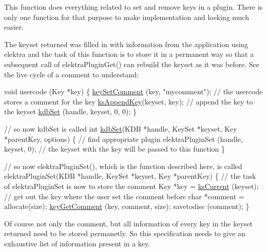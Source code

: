 This function does everything related to set and remove keys in a plugin. There is only one function for that purpose to make implementation and locking much easier.

The keyset {\ttfamily returned} was filled in with information from the application using elektra and the task of this function is to store it in a permanent way so that a subsequent call of elektra\-Plugin\-Get() can rebuild the keyset as it was before. See the live cycle of a comment to understand\-: 
\begin{DoxyCode}
\textcolor{keywordtype}{void} usercode (Key *key)
\{
        \hyperlink{group__keyvalue_ga8863a877a84fa46e6017fe72e49b89c1}{keySetComment} (key, \textcolor{stringliteral}{"mycomment"}); \textcolor{comment}{// the usercode stores a
       comment for the key}
        \hyperlink{group__keyset_gaa5a1d467a4d71041edce68ea7748ce45}{ksAppendKey}(keyset, key); \textcolor{comment}{// append the key to the keyset}
        \hyperlink{group__kdb_ga11436b058408f83d303ca5e996832bcf}{kdbSet} (handle, keyset, 0, 0);
\}

\textcolor{comment}{// so now kdbSet is called}
\textcolor{keywordtype}{int} \hyperlink{group__kdb_ga11436b058408f83d303ca5e996832bcf}{kdbSet}(KDB *handle, KeySet *keyset, Key *parentKey, options)
\{
        \textcolor{comment}{// find appropriate plugin}
        elektraPluginSet (handle, keyset, 0); \textcolor{comment}{// the keyset with the key will
       be passed to this function}
\}

\textcolor{comment}{// so now elektraPluginSet(), which is the function described here, is called}
elektraPluginSet(KDB *handle, KeySet *keyset, Key *parentKey)
\{
        \textcolor{comment}{// the task of elektraPluginSet is now to store the comment}
        Key *key = \hyperlink{group__keyset_ga4287b9416912c5f2ab9c195cb74fb094}{ksCurrent} (keyset); \textcolor{comment}{// get out the key where the
       user set the comment before}
        \textcolor{keywordtype}{char} *comment = allocate(size);
        \hyperlink{group__keyvalue_gafb89735689929ff717cc9f2d0d0b46a2}{keyGetComment} (key, comment, size);
        savetodisc (comment);
\}
\end{DoxyCode}
 Of course not only the comment, but all information of every key in the keyset {\ttfamily returned} need to be stored permanetly. So this specification needs to give an exhaustive list of information present in a key.

